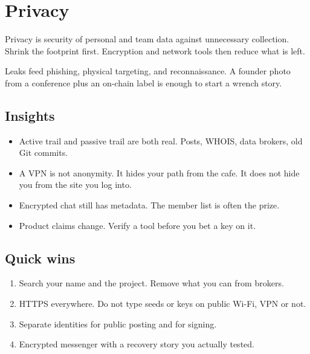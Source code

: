 \chapter{Privacy}

Privacy is security of personal and team data against
unnecessary collection. Shrink the footprint first.
Encryption and network tools then reduce what is left.

Leaks feed phishing, physical targeting, and
reconnaissance. A founder photo from a conference plus
an on-chain label is enough to start a wrench story.

\section{Insights}

\begin{itemize}
  \item Active trail and passive trail are both real.
  Posts, WHOIS, data brokers, old Git commits.
  \item A VPN is not anonymity. It hides your path from
  the cafe. It does not hide you from the site you log
  into.
  \item Encrypted chat still has metadata. The member
  list is often the prize.
  \item Product claims change. Verify a tool before you
  bet a key on it.
\end{itemize}

\section{Quick wins}

\begin{enumerate}
  \item Search your name and the project. Remove what
  you can from brokers.
  \item HTTPS everywhere. Do not type seeds or keys on
  public Wi-Fi, VPN or not.
  \item Separate identities for public posting and for
  signing.
  \item Encrypted messenger with a recovery story you
  actually tested.
\end{enumerate}
